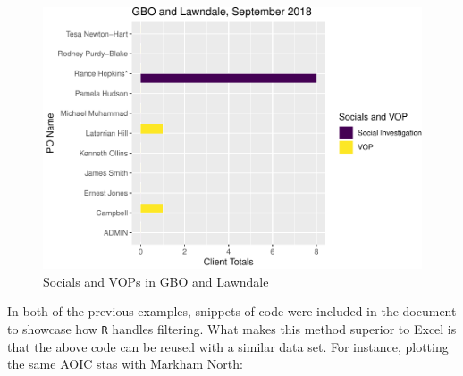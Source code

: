 \documentclass[12pt,]{article}
\begin{document}
\begin{figure}
\centering
\includegraphics{reporting_updates_files/figure-latex/SI_VOP-1.pdf}
\caption{Socials and VOPs in GBO and Lawndale}
\end{figure}

In both of the previous examples, snippets of code were included in the
document to showcase how \texttt{R} handles filtering. What makes this
method superior to Excel is that the above code can be reused with a
similar data set. For instance, plotting the same AOIC stas with Markham
North:
\end{document}
